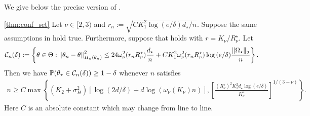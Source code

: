 We give below the precise version of .
\begin{customthm}{\ref{thm:conf_set}}
    Let $\nu \in [2, 3)$ and $r_n := \sqrt{CK_1^2 \log{(e/\delta)} d_\star / n}$.
    Suppose the same assumptions in  hold true.
    Furthermore, suppose that  holds with $r = K_\nu / R_\nu^\star$.
    Let
    \begin{align*}
        \mathcal{C}_n(\delta) := \left\{\theta \in \Theta: \left\lVert \theta_n - \theta \right\rVert_{H_n(\theta_n)}^2 \le 24 \omega_\nu^2(r_n R_\nu^\star) \frac{d_\star}{n} + C K_1^2 \omega_\nu^2(r_n R_\nu^\star) \log{(e/\delta)} \frac{\left\lVert \Omega_\star \right\rVert_2}{n} \right\}.
    \end{align*}
    Then we have $\operatorname{\mathbb P}(\theta_\star \in \mathcal{C}_n(\delta)) \ge 1 - \delta$ whenever $n$ satisfies
    \begin{align*}
        n \ge C \max\left\{(K_2 + \sigma_H^2)\left[\log(2d/\delta) + d\log{(\omega_{\nu}(K_\nu) n)} \right], \left[ \frac{(R_\nu^\star)^2 K_1^2 d_\star \log{(e/\delta)}}{K_\nu^2} \right]^{1/(3-\nu)} \right\}.
    \end{align*}
    Here $C$ is an absolute constant which may change from line to line.
\end{customthm}

